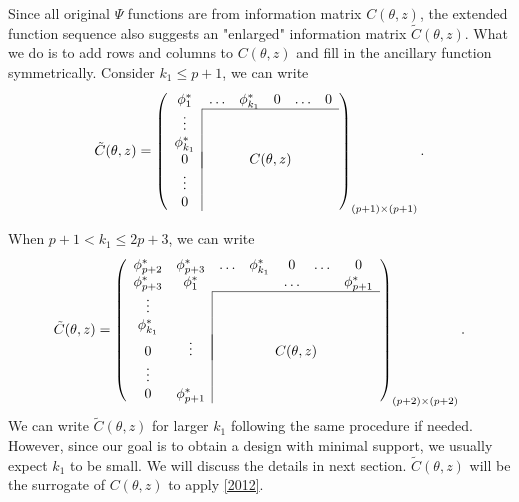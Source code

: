 \documentclass[11pt]{amsart}
\newtheorem{theorem}{Theorem}[section]
\theoremstyle{definition}
\theoremstyle{remark}
\begin{document}
Since all original $\Psi$ functions are from information matrix $C(\theta,z)$, the extended function sequence also suggests an "enlarged" information matrix $\tilde{C}(\theta,z)$. What we do is to add rows and columns to $C(\theta,z)$ and fill in the ancillary function symmetrically. Consider $k_1\le p+1$, we can write \begin{equation}
   \tilde{C}(\theta,z) = \left ( \begin{array}{c|ccccc}
\multicolumn{1}{c}{\phi^*_1}& \ldots& \phi^*_{k_1} &0 &\ldots& 0\\\cline{2-6}
\vdots &  &&&&\\
\phi^*_{k_1} &&&&&\\
0 &\multicolumn{5}{|c}{C(\theta,z)}\\
\vdots &&&&&\\
0&&&&&
\end{array}\right)_{(p+1)\times (p+1)}.
\end{equation} 

When $ p+1< k_1 \le2p+3$, we can write\begin{equation}
   \tilde{C}(\theta,z) = \left ( \begin{array}{cc|ccccc}
\phi^*_{p+2}& \multicolumn{1}{c}{\phi^*_{p+3}}&  \ldots& \phi^*_{k_1} &0 &\ldots& 0\\
\phi^*_{p+3}&\multicolumn{1}{c}{\phi^*_{1}}& && \ldots&& \phi^*_{p+1}\\\cline{3-7}
\vdots &  &&&&&\\
\phi^*_{k_1} &&&&&\\
0 &\vdots &\multicolumn{5}{|c}{C(\theta,z)}\\
\vdots &&&&&&\\
0&\phi^*_{p+1}&&&&&
\end{array}\right)_{(p+2)\times (p+2)}.
\end{equation} We can write $\tilde{C}(\theta,z)$ for larger $k_1$ following the same procedure if needed. However, since our goal is to obtain a design with minimal support, we usually expect $k_1$ to be small. We will discuss the details in next section. $\tilde{C}(\theta,z)$ will be the surrogate of $C(\theta,z)$ to apply \ref{2012}.




\end{document}
